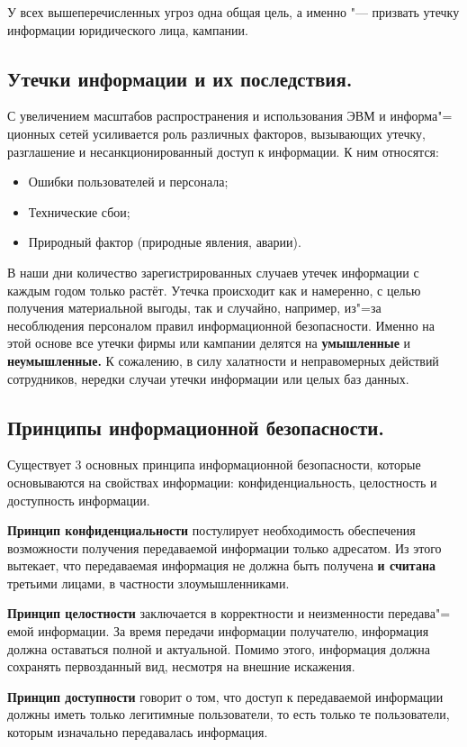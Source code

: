 У всех вышеперечисленных угроз одна общая цель, а именно "--- призвать утечку информации юридического лица, кампании.

\newpage
\subsection{Утечки информации и их последствия.}
С увеличением масштабов распространения и использования ЭВМ и информа"=
ционных сетей усиливается роль различных факторов, вызывающих утечку, 
разглашение и несанкционированный доступ к информации. К ним относятся:
\begin{itemize}
    \item Ошибки пользователей и персонала;
    \item Технические сбои;
    \item Природный фактор (природные явления, аварии).
\end{itemize}
В наши дни количество зарегистрированных случаев утечек информации с каждым годом только растёт. Утечка происходит как и намеренно, с целью получения
материальной выгоды, так и случайно, например, из"=за несоблюдения персоналом правил информационной безопасности. Именно на этой основе все утечки фирмы или кампании
делятся на \textbf{умышленные} и \textbf{неумышленные.} К сожалению, в силу халатности и неправомерных действий сотрудников, нередки случаи утечки информации или целых
баз данных.

\subsection{Принципы информационной безопасности.}
Существует 3 основных принципа информационной безопасности, которые основываются на свойствах информации: конфиденциальность, целостность и доступность информации.

\textbf{Принцип конфиденциальности} постулирует необходимость обеспечения возможности получения передаваемой информации только адресатом. Из этого вытекает, что передаваемая информация
не должна быть получена \textbf{и считана} третьими лицами, в частности злоумышленниками.

\textbf{Принцип целостности} заключается в корректности и неизменности передава"=
емой информации. За время передачи информации получателю, информация должна оставаться полной и актуальной.
Помимо этого, информация должна сохранять первозданный вид, несмотря на внешние искажения.

\textbf{Принцип доступности} говорит о том, что доступ к передаваемой информации должны иметь только легитимные пользователи, то есть только те пользователи, которым изначально
передавалась информация.

